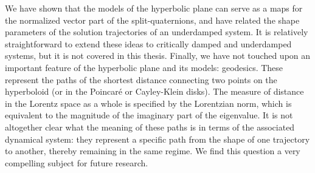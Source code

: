 We have shown that the models of the hyperbolic plane can serve as a maps for the normalized vector part of the split-quaternions, and have related the shape parameters of the solution trajectories of an underdamped system. It is relatively straightforward to extend these ideas to critically damped and underdamped systems, but it is not covered in this thesis. Finally, we have not touched upon an important feature of the hyperbolic plane and its models: geodesics. These represent the paths of the shortest distance connecting two points on the hyperboloid (or in the Poincaré or Cayley-Klein disks).  The measure of distance in the Lorentz space as a whole is specified by the Lorentzian norm, which is equivalent to the magnitude of the imaginary part of the eigenvalue. It is not altogether clear what the meaning of these paths is in terms of the associated dynamical system: they represent a specific path from the shape of one trajectory to another, thereby remaining in the same regime. We find this question a very compelling subject for future research.

